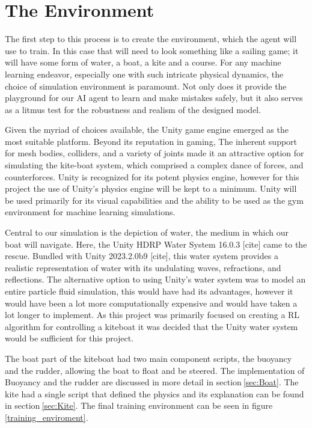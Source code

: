\section{The Environment}

The first step to this process is to create the environment, which the agent will use to train. In this case that will need to look something like a sailing game; it will have some form of water, a boat, a kite and a course. 
For any machine learning endeavor, especially one with such intricate physical dynamics, the choice of simulation environment is paramount. Not only does it provide the playground for our AI agent to learn and make mistakes safely, but it also serves as a litmus test for the robustness and realism of the designed model.

Given the myriad of choices available, the Unity game engine emerged as the most suitable platform. Beyond its reputation in gaming, 
The inherent support for mesh bodies, colliders, and a variety of joints made it an attractive option for simulating the kite-boat system, which comprised a complex dance of forces, and counterforces.
Unity is recognized for its potent physics engine, however for this project the use of Unity's physics engine will be kept to a minimum. Unity will be used primarily for its visual capabilities and the ability to be used as the gym environment for machine learning simulations. 

Central to our simulation is the depiction of water, the medium in which our boat will navigate. Here, the Unity HDRP Water System 16.0.3 [cite] came to the rescue. Bundled with Unity 2023.2.0b9 [cite], this water system provides a realistic representation of water with its undulating waves, refractions, and reflections. 
The alternative option to using Unity's water system was to model an entire particle fluid simulation, this would have had its advantages, however it would have been a lot more computationally expensive and would have taken a lot longer to implement. As this project was primarily focused on creating a RL algorithm for controlling a kiteboat it was decided that the Unity water system would be sufficient for this project.  

The boat part of the kiteboat had two main component scripts, the buoyancy and the rudder, allowing the boat to float and be steered. The implementation of Buoyancy and the rudder are discussed in more detail in section$~$\ref{sec:Boat}. The kite had a single script that defined the physics and its explanation can be found in section$~$\ref{sec:Kite}. The final training environment can be seen in figure$~$\ref{training_enviroment}.

